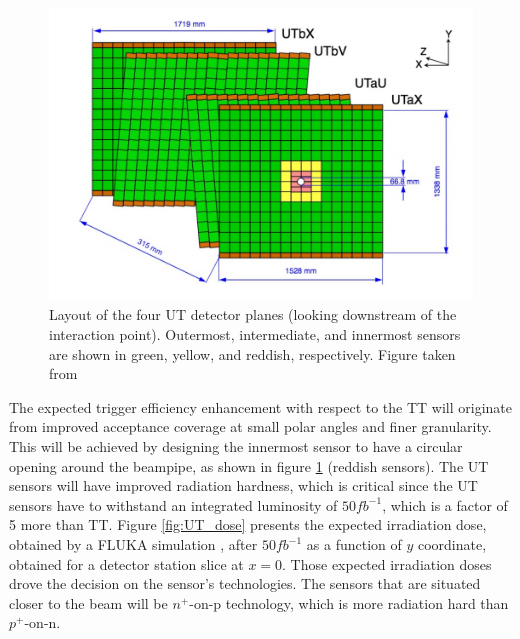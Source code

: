  \begin{figure}[!h]
\centering
\includegraphics{figures/UT.png}
\caption{Layout of the four UT detector planes (looking downstream of the interaction point). Outermost, intermediate, and innermost sensors are shown in green, yellow, and reddish, respectively. Figure taken from \cite{upgrade_tracker_tdr}
\label{fig:UT_scheme}}
\end{figure}


The expected trigger efficiency enhancement with respect to the TT will originate from improved acceptance coverage at small polar angles and finer granularity.  This will be achieved by designing the innermost sensor to have a circular opening around the beampipe, as shown in figure \ref{fig:UT_scheme} (reddish sensors). The UT sensors will have improved radiation hardness, which is critical since the UT sensors have to withstand an integrated luminosity of $50 fb^{-1}$, which is a factor of 5 more than TT.  Figure \ref{fig:UT_dose} presents  the expected irradiation dose, obtained by a FLUKA simulation \cite{fluka}, after $50 fb^{-1}$ as a function of $y$ coordinate, obtained for a detector station slice at $x=0$. Those expected irradiation doses drove the decision on the sensor's technologies. The sensors that are situated closer to the beam will be $n^{+}\text{-on-p}$ technology, which is more radiation hard than $p^{+}\text{-on-n}$.  
 

